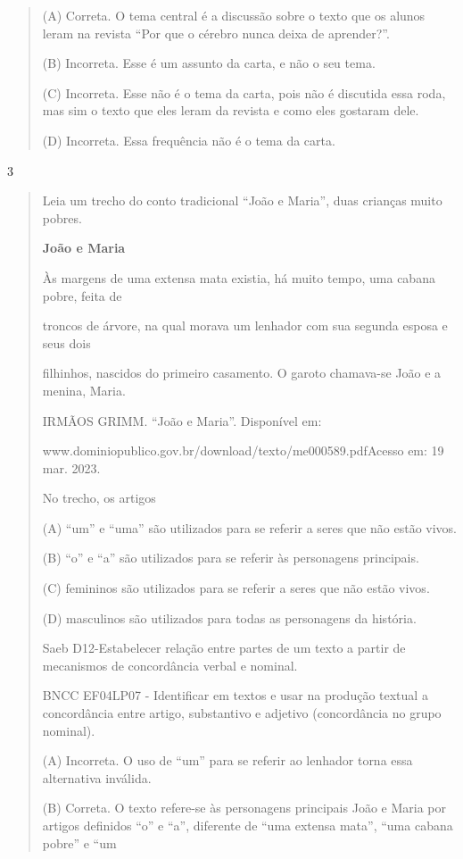 \begin{escolha}
\begin{quote}
(A) Correta. O tema central é a discussão sobre o texto que os alunos
leram na revista ``Por que o cérebro nunca deixa de aprender?''.

(B) Incorreta. Esse é um assunto da carta, e não o seu tema.

(C) Incorreta. Esse não é o tema da carta, pois não é discutida essa
roda, mas sim o texto que eles leram da revista e como eles gostaram
dele.

(D) Incorreta. Essa frequência não é o tema da carta.
\end{quote}

\num{3}

\begin{quote}
Leia um trecho do conto tradicional ``João e Maria'', duas crianças
muito pobres.

\textbf{João e Maria}

Às margens de uma extensa mata existia, há muito tempo, uma cabana
pobre, feita de

troncos de árvore, na qual morava um lenhador com sua segunda esposa e
seus dois

filhinhos, nascidos do primeiro casamento. O garoto chamava-se João e a
menina, Maria.

IRMÃOS GRIMM. ``João e Maria''. Disponível em:

www.dominiopublico.gov.br/download/texto/me000589.pdfAcesso em: 19 mar.
2023.

No trecho, os artigos

(A) ``um'' e ``uma'' são utilizados para se referir a seres que não
estão vivos.

(B) ``o'' e ``a'' são utilizados para se referir às personagens
principais.

(C) femininos são utilizados para se referir a seres que não estão
vivos.

(D) masculinos são utilizados para todas as personagens da história.

Saeb D12-Estabelecer relação entre partes de um texto a partir de
mecanismos de concordância verbal e nominal.

BNCC EF04LP07 - Identificar em textos e usar na produção textual a
concordância entre artigo, substantivo e adjetivo (concordância no grupo
nominal).

(A) Incorreta. O uso de ``um'' para se referir ao lenhador torna essa
alternativa inválida.

(B) Correta. O texto refere-se às personagens principais João e Maria
por artigos definidos ``o'' e ``a'', diferente de ``uma extensa mata'',
``uma cabana pobre'' e ``um


\end{quote}
\end{escolha}
